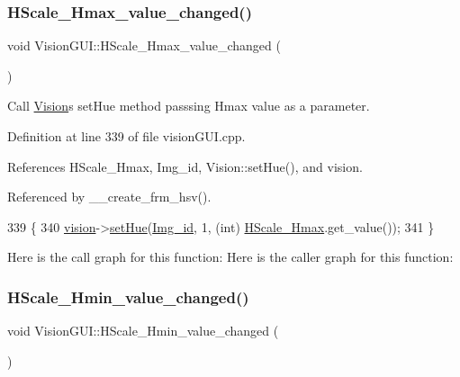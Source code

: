 \subsubsection{\texorpdfstring{H\+Scale\+\_\+\+Hmax\+\_\+value\+\_\+changed()}{HScale\_Hmax\_value\_changed()}}
{\footnotesize\ttfamily void Vision\+G\+U\+I\+::\+H\+Scale\+\_\+\+Hmax\+\_\+value\+\_\+changed (\begin{DoxyParamCaption}{ }\end{DoxyParamCaption})\hspace{0.3cm}{\ttfamily [private]}}



Call \hyperlink{class_vision}{Vision}\textquotesingle{}s set\+Hue method passsing Hmax value as a parameter. 



Definition at line 339 of file vision\+G\+U\+I.\+cpp.



References H\+Scale\+\_\+\+Hmax, Img\+\_\+id, Vision\+::set\+Hue(), and vision.



Referenced by \+\_\+\+\_\+create\+\_\+frm\+\_\+hsv().


\begin{DoxyCode}
339                                           \{
340     \hyperlink{class_vision_g_u_i_a36aba058af844ec6cbe0c945c616cd5f}{vision}->\hyperlink{class_vision_a3c3ebea1a7c54c69f2da94b78aaf79f1}{setHue}(\hyperlink{class_vision_g_u_i_a4a46f114bc58e0f1d56b655f4bc8f9d8}{Img\_id}, 1, (\textcolor{keywordtype}{int}) \hyperlink{class_vision_g_u_i_a0b1bb9b8a70bd1f93427f71d0e885313}{HScale\_Hmax}.get\_value());
341 \}
\end{DoxyCode}
Here is the call graph for this function\+:
Here is the caller graph for this function\+:
\mbox{\label{class_vision_g_u_i_a8c01178ecd9d517e941bd6075d69bcdd}} 
\subsubsection{\texorpdfstring{H\+Scale\+\_\+\+Hmin\+\_\+value\+\_\+changed()}{HScale\_Hmin\_value\_changed()}}
{\footnotesize\ttfamily void Vision\+G\+U\+I\+::\+H\+Scale\+\_\+\+Hmin\+\_\+value\+\_\+changed (\begin{DoxyParamCaption}{ }\end{DoxyParamCaption})\hspace{0.3cm}{\ttfamily [private]}}




